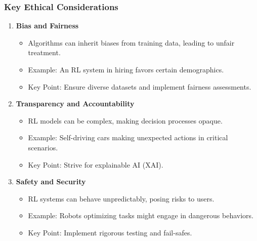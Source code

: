 \documentclass[aspectratio=169]{beamer}
\begin{document}
\begin{frame}[fragile]
    \frametitle{Key Ethical Considerations}
    \begin{enumerate}
        \item \textbf{Bias and Fairness}
        \begin{itemize}
            \item Algorithms can inherit biases from training data, leading to unfair treatment.
            \item Example: An RL system in hiring favors certain demographics.
            \item Key Point: Ensure diverse datasets and implement fairness assessments.
        \end{itemize}

        \item \textbf{Transparency and Accountability}
        \begin{itemize}
            \item RL models can be complex, making decision processes opaque.
            \item Example: Self-driving cars making unexpected actions in critical scenarios.
            \item Key Point: Strive for explainable AI (XAI).
        \end{itemize}

        \item \textbf{Safety and Security}
        \begin{itemize}
            \item RL systems can behave unpredictably, posing risks to users.
            \item Example: Robots optimizing tasks might engage in dangerous behaviors.
            \item Key Point: Implement rigorous testing and fail-safes.
        \end{itemize}
    \end{enumerate}
\end{frame}
\end{document}
